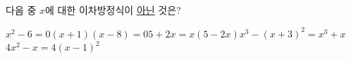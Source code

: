 다음 중 $x$에 대한 이차방정식이 \underline{아닌} 것은?
\begin{choicesii}{$x^2-6=0$}{$(x+1)(x-8)=0$}{$5+2x=x(5-2x)$}{$x^3-(x+3)^2=x^3+x$}{$4x^2-x=4(x-1)^2$}\end{choicesii}
